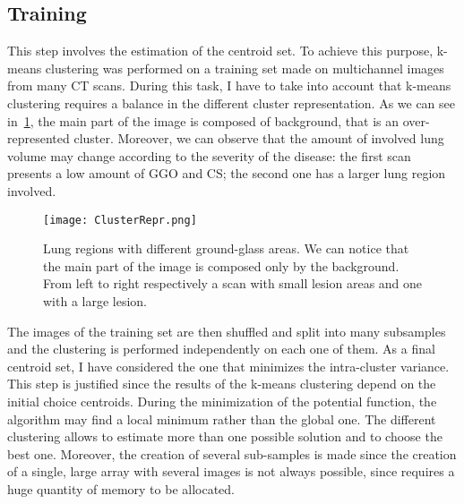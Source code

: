 \documentclass{standalone}
\begin{document}
	\subsection*{Training}
	
	This step involves the estimation of the centroid set. To achieve this purpose, k-means clustering was performed on a training set made on multichannel images from many CT scans. During this task, I have to take into account that k-means clustering requires a balance in the different cluster representation. As we can see in \figurename\,\ref{fig:ClusterRepr}, the main part of the image is composed of background, that is an over-represented cluster. Moreover, we can observe that the amount of involved lung volume may change according to the severity of the disease: the first scan presents a low amount of GGO and CS; the second one has a larger lung region involved.

	\begin{figure}[h!]
		\centering
		\texttt{[image: ClusterRepr.png]}
		\caption{Lung regions with different ground-glass areas. We can notice that the main part of the image is composed only by the background. From left to right respectively a scan with small lesion areas and one with a large lesion.}\label{fig:ClusterRepr}
	\end{figure}

	
	The images of the training set are then shuffled and split into many subsamples and the clustering is performed independently on each one of them. As a final centroid set, I have considered the one that minimizes the intra-cluster variance. This step is justified since the results of the k-means clustering depend on the initial choice centroids. During the minimization of the potential function, the algorithm may find a local minimum rather than the global one. The different clustering allows to estimate more than one possible solution and to choose the best one. Moreover, the creation of several sub-samples is made since the creation of a single, large array with several images is not always possible, since requires a huge quantity of memory to be allocated.
\end{document}
